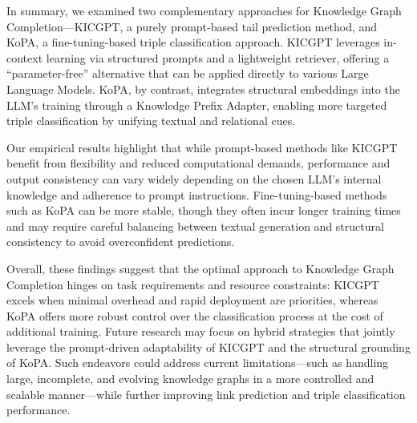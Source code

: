 \documentclass[12pt,a4paper]{article}
\begin{document}
In summary, we examined two complementary approaches for Knowledge Graph Completion—KICGPT, a purely prompt-based tail prediction method, and KoPA, a fine-tuning-based triple classification approach. KICGPT leverages in-context learning via structured prompts and a lightweight retriever, offering a ``parameter-free'' alternative that can be applied directly to various Large Language Models. KoPA, by contrast, integrates structural embeddings into the LLM's training through a Knowledge Prefix Adapter, enabling more targeted triple classification by unifying textual and relational cues.

Our empirical results highlight that while prompt-based methods like KICGPT benefit from flexibility and reduced computational demands, performance and output consistency can vary widely depending on the chosen LLM's internal knowledge and adherence to prompt instructions. Fine-tuning-based methods such as KoPA can be more stable, though they often incur longer training times and may require careful balancing between textual generation and structural consistency to avoid overconfident predictions.

Overall, these findings suggest that the optimal approach to Knowledge Graph Completion hinges on task requirements and resource constraints: KICGPT excels when minimal overhead and rapid deployment are priorities, whereas KoPA offers more robust control over the classification process at the cost of additional training. Future research may focus on hybrid strategies that jointly leverage the prompt-driven adaptability of KICGPT and the structural grounding of KoPA. Such endeavors could address current limitations—such as handling large, incomplete, and evolving knowledge graphs in a more controlled and scalable manner—while further improving link prediction and triple classification performance.


\end{document}
